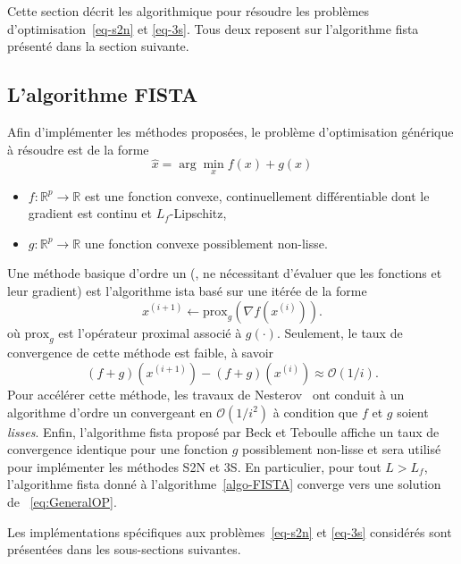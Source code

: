 Cette section décrit les algorithmique pour résoudre les problèmes d'optimisation~\eqref{eq-s2n} et \eqref{eq-3s}. Tous deux reposent sur l'algorithme \gls{fista}~\cite{beck_fast_2009} présenté dans la section suivante.

\subsection{L'algorithme FISTA}\label{sec-fista}

Afin d'implémenter les méthodes proposées, le problème d'optimisation générique à résoudre est de la forme
\begin{equation}
\hat{x} = \arg\min_x f(x) + g(x) \label{eq:GeneralOP}
\end{equation}
\begin{itemize}
    \item $f : \mathbb{R}^p \to \mathbb{R}$ est une fonction convexe, continuellement différentiable dont le gradient est continu et $L_{f}$-Lipschitz,
    \item $g : \mathbb{R}^p \to \mathbb{R}$ une fonction convexe possiblement non-lisse.
\end{itemize}
Une méthode basique d'ordre un (\ie{}, ne nécessitant d'évaluer que les fonctions et leur gradient) est l'algorithme \gls{ista} basé sur une itérée de la forme
\begin{equation}
    x^{(i+1)} \leftarrow \mathrm{prox}_{g}( \nabla f(x^{(i)})).
\end{equation}
où $\mathrm{prox}_{g}$ est l'opérateur proximal associé à $g(\cdot)$. Seulement, le taux de convergence de cette méthode est faible, à savoir
\begin{equation}
(f+g)(x^{(i+1)}) - (f+g)(x^{(i)}) \approx \mathcal{O}(1/i).
\end{equation}
Pour accélérer cette méthode, les travaux de Nesterov~\cite{nesterov1983method} ont conduit à un algorithme  d'ordre un convergeant en $\mathcal{O}(1/i^2)$ à condition que $f$ et $g$ soient \emph{lisses}. Enfin, l'algorithme \gls{fista} proposé par Beck et Teboulle affiche un taux de convergence identique pour une fonction $g$ possiblement non-lisse et sera utilisé pour implémenter les méthodes S2N et 3S. En particulier, pour tout $L> L_{f}$, l'algorithme \gls{fista} donné à l'algorithme~\ref{algo-FISTA} converge vers une solution de ~\eqref{eq:GeneralOP}.

Les implémentations spécifiques aux problèmes~\eqref{eq-s2n} et \eqref{eq-3s} considérés sont présentées dans les sous-sections suivantes.

